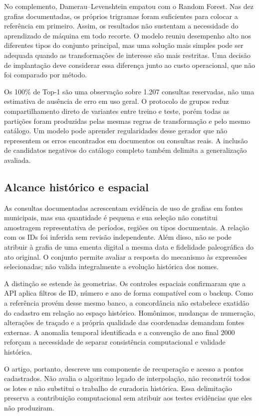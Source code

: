 No complemento, Damerau--Levenshtein empatou com o Random Forest. Nas dez grafias documentadas, os próprios trigramas foram suficientes para colocar a referência em primeiro. Assim, os resultados não sustentam a necessidade do aprendizado de máquina em todo recorte. O modelo reuniu desempenho alto nos diferentes tipos do conjunto principal, mas uma solução mais simples pode ser adequada quando as transformações de interesse são mais restritas. Uma decisão de implantação deve considerar essa diferença junto ao custo operacional, que não foi comparado por método.

Os 100\% de Top-1 são uma observação sobre 1.207 consultas reservadas, não uma estimativa de ausência de erro em uso geral. O protocolo de grupos reduz compartilhamento direto de variantes entre treino e teste, porém todas as partições foram produzidas pelas mesmas regras de transformação e pelo mesmo catálogo. Um modelo pode aprender regularidades desse gerador que não representem os erros encontrados em documentos ou consultas reais. A inclusão de candidatos negativos do catálogo completo também delimita a generalização avaliada.

\subsection{Alcance histórico e espacial}

As consultas documentadas acrescentam evidência de uso de grafias em fontes municipais, mas sua quantidade é pequena e sua seleção não constitui amostragem representativa de períodos, regiões ou tipos documentais. A relação com os IDs foi inferida sem revisão independente. Além disso, não se pode atribuir à grafia de uma ementa digital a mesma data e fidelidade paleográfica do ato original. O conjunto permite avaliar a resposta do mecanismo às expressões selecionadas; não valida integralmente a evolução histórica dos nomes.

A distinção se estende às geometrias. Os controles espaciais confirmaram que a API aplica filtros de ID, número e ano de forma compatível com o backup. Como a referência provém desse mesmo banco, a concordância não estabelece exatidão do cadastro em relação ao espaço histórico. Homônimos, mudanças de numeração, alterações de traçado e a própria qualidade das coordenadas demandam fontes externas. A anomalia temporal identificada e a convenção de ano final 2000 reforçam a necessidade de separar consistência computacional e validade histórica.

O artigo, portanto, descreve um componente de recuperação e acesso a pontos cadastrados. Não avalia o algoritmo legado de interpolação, não reconstrói todos os lotes e não substitui o trabalho de curadoria histórica. Essa delimitação preserva a contribuição computacional sem atribuir aos testes evidências que eles não produziram.

